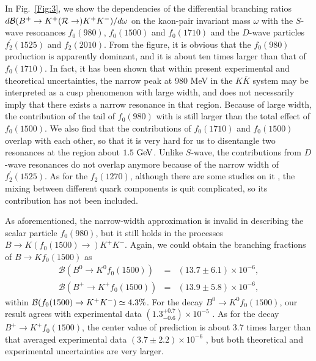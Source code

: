 \documentclass[11pt]{article}
\begin{document}
In Fig.~\ref{Fig:3}, we show the dependencies of the differential branching ratios $d{\cal B}(B^+\to K^+({\cal R}\to) K^+K^-)/d\omega$ on the kaon-pair invariant mass $\omega$  with the $S$-wave resonances $f_0(980)$, $f_0(1500)$ and $f_0(1710)$ and the $D$-wave particles $f_2^\prime(1525)$ and $f_2(2010)$. From the figure, it is obvious that the $f_0(980)$ production is apparently dominant, and it is about ten times larger than that of $f_0(1710)$. In fact, it has been shown that within present experimental and theoretical uncertainties, the narrow peak at 980 MeV in the $K\bar K$ system may be interpreted as a cusp phenomenon with large width, and does not necessarily imply that there exists a narrow resonance in that region. Because of large width, the contribution of the tail of $f_0(980)$ with is still larger than the total effect of $f_0(1500)$. We also find that the contributions of $f_0(1710)$ and  $f_0(1500)$ overlap with each other, so that it is very hard for us to disentangle two resonances at the region about $1.5~\rm GeV$. Unlike $S$-wave, the contributions from $D$-wave resonances do not overlap anymore because of the narrow width of $f_2^\prime(1525)$. As for the $f_2 (1270)$, although there are some studies on it \cite{Li:2018lbd}, the mixing between different quark components is quit complicated, so its contribution has not been included.

As aforementioned, the narrow-width approximation is invalid in describing the scalar particle $f_0(980)$, but it  still holds in the processes $B \to K(f_0(1500) \to) K^+K^-$. Again, we could obtain the branching fractions of $B\to Kf_0(1500)$ as
 \begin{eqnarray}
 \mathcal{B}(B^{0}\to K^{0}f_0(1500))&=&(13.7\pm6.1)\times 10^{-6},\\
 \mathcal{B}(B^{+}\to K^{+}f_0(1500))&=&(13.9\pm5.8)\times 10^{-6},
 \end{eqnarray}
within ${\cal B}(f_0(1500)\to K^+K^-)\simeq 4.3\%$. For the decay $B^{0}\to K^{0}f_0(1500)$, our result agrees with experimental data $(1.3^{+0.7}_{-0.6})\times 10^{-5}$ \cite{Zyla:2020zbs}.  As for the decay $B^{+}\to K^{+}f_0(1500)$, the center value of prediction is about 3.7 times larger than that averaged experimental data $ (3.7 \pm 2.2)\times 10^{-6}$ \cite{Zyla:2020zbs}, but both theoretical and experimental uncertainties are very larger.
\end{document}
